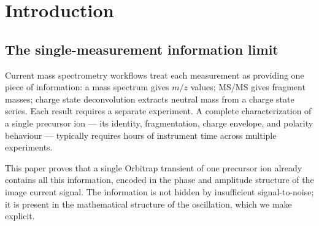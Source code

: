 \documentclass[twocolumn,10pt,a4paper]{article}
\theoremstyle{thmstyle}
\theoremstyle{definition}
\theoremstyle{remark}
\begin{document}
\begin{abstract}
We derive the structural basis for SWIFT (Stored Waveform Inverse
Fourier Transform) excitation in FT-ICR as virtual substate cancellation;
define \emph{impossible ions} as virtual combinations whose mean
falls at a partition address with no chemical realization, and show they
serve as crossing-symmetry probes; and derive a design equation for
$N$-route mass verification that scales as $2K(d+1)^{-n_P}$.

All results are falsifiable against existing Orbitrap and FT-ICR data:
the primary prediction is that fragment ions of any given precursor
appear as subharmonic components in the precursor transient at rational
frequency multiples, with phase $\Delta\theta = 2\pi\Delta M$.

\medskip
\noindent\textbf{Keywords:} partition bijection, virtual substates,
phase coherence, subharmonic fragments, Orbitrap transient, FT-ICR,
charge state, polarity switching, virtual tensor, SWIFT, impossible
ions, crossing symmetry, single-measurement MS/MS
\end{abstract}

\tableofcontents

\section{Introduction}
\label{sec:intro}

\subsection{The single-measurement information limit}

Current mass spectrometry workflows treat each measurement as providing
one piece of information: a mass spectrum gives $m/z$ values; MS/MS
gives fragment masses; charge state deconvolution extracts neutral mass
from a charge state series. Each result requires a separate experiment.
A complete characterization of a single precursor ion --- its identity,
fragmentation, charge envelope, and polarity behaviour --- typically
requires hours of instrument time across multiple experiments.

This paper proves that a single Orbitrap transient of one precursor ion
already contains all this information, encoded in the phase and amplitude
structure of the image current signal. The information is not hidden by
insufficient signal-to-noise; it is present in the mathematical structure
of the oscillation, which we make explicit.
\end{document}
